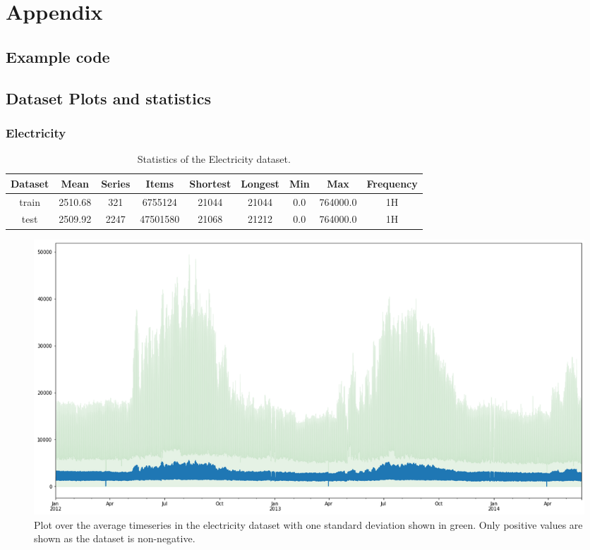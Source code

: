 \chapter{Appendix}
\section{Example code}

\section{Dataset Plots and statistics}
\clearpage
\subsection{Electricity}
\begin{table}[htb]
    \begin{tabular}{||c | c c c c c c c c ||}
        \hline
        Dataset & Mean    & Series & Items    & Shortest & Longest & Min & Max      & Frequency \\ [0.5ex]
        \hline\hline
        train   & 2510.68 & 321    & 6755124  & 21044    & 21044   & 0.0 & 764000.0 & 1H        \\
        \hline
        test    & 2509.92 & 2247   & 47501580 & 21068    & 21212   & 0.0 & 764000.0 & 1H        \\
        \hline
    \end{tabular}
    \caption{Statistics of the Electricity dataset.}
\end{table}

\begin{figure}[htb]
    \centering
    \includegraphics[width=\linewidth]{./img/electricity_plot.png}
    \caption{Plot over the average timeseries in the electricity dataset with one standard deviation shown in green. Only positive values are shown as the dataset is non-negative.}
    \label{fig:electricity_plot}
    \endminipage\hfill
\end{figure}

